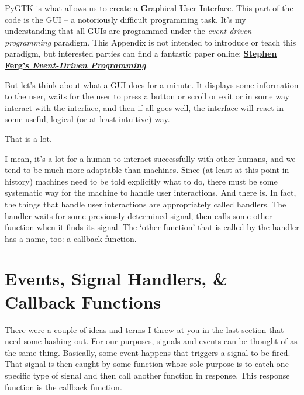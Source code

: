 \documentclass{report}
\begin{document}
\begin{appendices}

PyGTK is what allows us to create a \textbf{G}raphical \textbf{U}ser \textbf{I}nterface. This part of the code is the GUI -- a notoriously difficult programming task. It's my understanding that all GUIs are programmed under the \textit{event-driven programming} paradigm. This Appendix is not intended to introduce or teach this paradigm, but interested parties can find a fantastic paper online: \href{http://eventdrivenpgm.sourceforge.net/}{\textbf{Stephen Ferg's \textit{Event-Driven Programming}}}.

But let's think about what a GUI does for a minute. It displays some information to the user, waits for the user to press a button or scroll or exit or in some way interact with the interface, and then if all goes well, the interface will react in some useful, logical (or at least intuitive) way. 

That is a lot. 

I mean, it's a lot for a human to interact successfully with other humans, and we tend to be much more adaptable than machines. Since (at least at this point in history) machines need to be told explicitly what to do, there must be some systematic way for the machine to handle user interactions. And there is. In fact, the things that handle user interactions are appropriately called handlers. The handler waits for some previously determined signal, then calls some other function when it finds its signal. The `other function' that is called by the handler has a name, too: a callback function.
\section{Events, Signal Handlers, \& Callback Functions}
There were a couple of ideas and terms I threw at you in the last section that need some hashing out. For our purposes, signals and events can be thought of as the same thing. Basically, some event happens that triggers a signal to be fired. That signal is then caught by some function whose sole purpose is to catch one specific type of signal and then call another function in response. This response function is the callback function.


\end{appendices}
\end{document}
